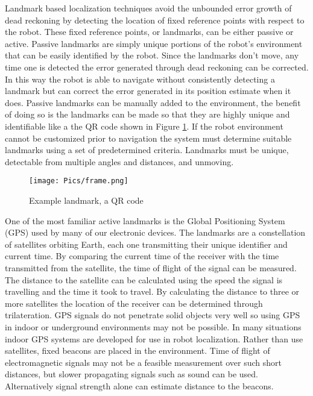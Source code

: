 Landmark based localization techniques avoid the unbounded error growth of dead reckoning by detecting the location of fixed reference points with respect to the robot. These fixed reference points, or landmarks, can be either passive or active. Passive landmarks are simply unique portions of the robot's environment that can be easily identified by the robot. Since the landmarks don't move, any time one is detected the error generated through dead reckoning can be corrected. In this way the robot is able to navigate without consistently detecting a landmark but can correct the error generated in its position estimate when it does. Passive landmarks can be manually added to the environment, the benefit of doing so is the landmarks can be made so that they are highly unique and identifiable like a the QR code shown in Figure \ref{fig:qr}. If the robot environment cannot be customized prior to navigation the system must determine suitable landmarks using a set of predetermined criteria. Landmarks must be unique, detectable from multiple angles and distances, and unmoving.\\

\begin{figure}
    \centering
    \texttt{[image: Pics/frame.png]}
    \caption{Example landmark, a QR code}
    \label{fig:qr}
\end{figure}

One of the most familiar active landmarks is the Global Positioning System (GPS) used by many of our electronic devices. The landmarks are a constellation of satellites orbiting Earth, each one transmitting their unique identifier and current time. By comparing the current time of the receiver with the time transmitted from the satellite, the time of flight of the signal can be measured. The distance to the satellite can be calculated using the speed the signal is travelling and the time it took to travel. By calculating the distance to three or more satellites the location of the receiver can be determined through trilateration. GPS signals do not penetrate solid objects very well so using GPS in indoor or underground environments may not be possible. In many situations indoor GPS systems are developed for use in robot localization. Rather than use satellites, fixed beacons are placed in the environment. Time of flight of electromagnetic signals may not be a feasible measurement over such short distances, but slower propagating signals such as sound can be used. Alternatively signal strength alone can estimate distance to the beacons.\\

